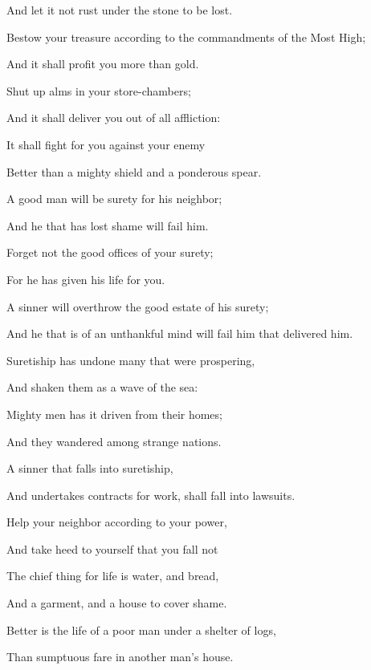 {\par }{\Q And let it not rust under the stone to be lost.
\par }{\Q {}Bestow your treasure according to the commandments of the Most High;
\par }{\Q And it shall profit you more than gold.
\par }{\Q {}Shut up alms in your store-chambers;
\par }{\Q And it shall deliver you out of all affliction:
\par }{\Q {}It shall fight for you against your enemy
\par }{\Q Better than a mighty shield and a ponderous spear.
\par }{\BB \par }{\Q {}A good man will be surety for his neighbor;
\par }{\Q And he that has lost shame will fail him.
\par }{\Q {}Forget not the good offices of your surety;
\par }{\Q For he has given his life for you.
\par }{\Q {}A sinner will overthrow the good estate of his surety;
\par }{\Q {}And he that is of an unthankful mind will fail him that delivered him.
\par }{\Q {}Suretiship has undone many that were prospering,
\par }{\Q And shaken them as a wave of the sea:
\par }{\Q Mighty men has it driven from their homes;
\par }{\Q And they wandered among strange nations.
\par }{\Q {}A sinner that falls into suretiship,
\par }{\Q And undertakes contracts for work, shall fall into lawsuits.
\par }{\Q {}Help your neighbor according to your power,
\par }{\Q And take heed to yourself that you fall not
{}
\par }{\BB \par }{\Q {}The chief thing for life is water, and bread,
\par }{\Q And a garment, and a house to cover shame.
\par }{\Q {}Better is the life of a poor man under a shelter of logs,
\par }{\Q Than sumptuous fare in another man’s house.
}
